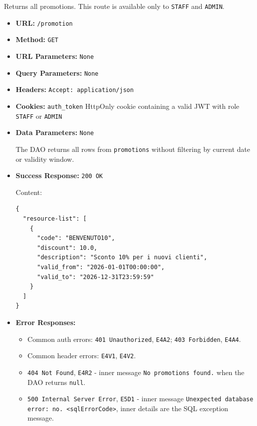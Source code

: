 Returns all promotions. This route is available only to \texttt{STAFF} and \texttt{ADMIN}.

\begin{itemize}[nosep]
\item \textbf{URL:} \texttt{/promotion}

\item \textbf{Method:} \texttt{GET}

\item \textbf{URL Parameters:} \texttt{None}

\item \textbf{Query Parameters:} \texttt{None}

\item \textbf{Headers:} \texttt{Accept: application/json}

\item \textbf{Cookies:} \texttt{auth\_token} HttpOnly cookie containing a valid JWT with role \texttt{STAFF} or \texttt{ADMIN}

\item \textbf{Data Parameters:} \texttt{None}

The DAO returns all rows from \texttt{promotions} without filtering by current date or validity window.

\item \textbf{Success Response:} \texttt{200 OK}

Content:

\begin{lstlisting}
{
  "resource-list": [
    {
      "code": "BENVENUTO10",
      "discount": 10.0,
      "description": "Sconto 10% per i nuovi clienti",
      "valid_from": "2026-01-01T00:00:00",
      "valid_to": "2026-12-31T23:59:59"
    }
  ]
}
\end{lstlisting}

\item \textbf{Error Responses:}

\begin{itemize}[nosep]
\item Common auth errors: \texttt{401 Unauthorized}, \texttt{E4A2}; \texttt{403 Forbidden}, \texttt{E4A4}.
\item Common header errors: \texttt{E4V1}, \texttt{E4V2}.
\item \texttt{404 Not Found}, \texttt{E4R2} - inner message \texttt{No promotions found.} when the DAO returns \texttt{null}.
\item \texttt{500 Internal Server Error}, \texttt{E5D1} - inner message \texttt{Unexpected database error: no. <sqlErrorCode>}, inner details are the SQL exception message.
\end{itemize}

\end{itemize}

